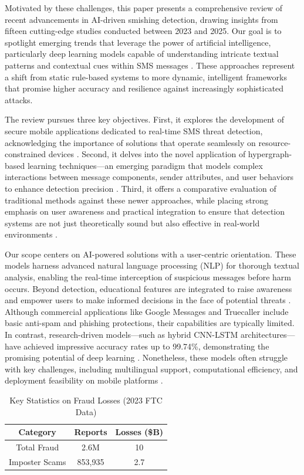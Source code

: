 \documentclass[conference]{IEEEtran}
\begin{document}
Motivated by these challenges, this paper presents a comprehensive review of recent advancements in AI-driven smishing detection, drawing insights from fifteen cutting-edge studies conducted between 2023 and 2025. Our goal is to spotlight emerging trends that leverage the power of artificial intelligence, particularly deep learning models capable of understanding intricate textual patterns and contextual cues within SMS messages \cite{ref7,ref11,ref12}. These approaches represent a shift from static rule-based systems to more dynamic, intelligent frameworks that promise higher accuracy and resilience against increasingly sophisticated attacks.

The review pursues three key objectives. First, it explores the development of secure mobile applications dedicated to real-time SMS threat detection, acknowledging the importance of solutions that operate seamlessly on resource-constrained devices \cite{ref9}. Second, it delves into the novel application of hypergraph-based learning techniques—an emerging paradigm that models complex interactions between message components, sender attributes, and user behaviors to enhance detection precision \cite{ref12,ref14,ref15}. Third, it offers a comparative evaluation of traditional methods against these newer approaches, while placing strong emphasis on user awareness and practical integration to ensure that detection systems are not just theoretically sound but also effective in real-world environments \cite{ref13}.

Our scope centers on AI-powered solutions with a user-centric orientation. These models harness advanced natural language processing (NLP) for thorough textual analysis, enabling the real-time interception of suspicious messages before harm occurs. Beyond detection, educational features are integrated to raise awareness and empower users to make informed decisions in the face of potential threats \cite{ref2,ref5}. Although commercial applications like Google Messages and Truecaller include basic anti-spam and phishing protections, their capabilities are typically limited. In contrast, research-driven models—such as hybrid CNN-LSTM architectures—have achieved impressive accuracy rates up to 99.74\%, demonstrating the promising potential of deep learning \cite{ref7}. Nonetheless, these models often struggle with key challenges, including multilingual support, computational efficiency, and deployment feasibility on mobile platforms \cite{ref5,ref11}.

\begin{table}[htbp]
\caption{Key Statistics on Fraud Losses (2023 FTC Data)}
\label{tab:intro_stats}
\centering
\begin{tabular}{|c|c|c|}
\hline
Category & Reports & Losses (\$B) \\
\hline
Total Fraud & 2.6M & 10 \\
\hline
Imposter Scams & 853,935 & 2.7 \\
\hline
\end{tabular}
\end{table}
\end{document}
